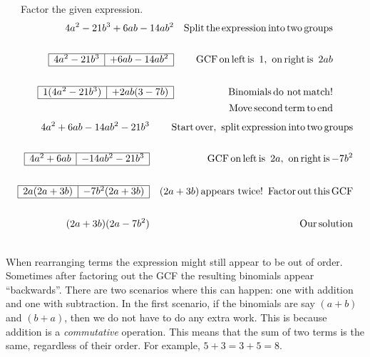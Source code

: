 \begin{example}~~~Factor the given expression.
  \begin{eqnarray*}
    4 a^2 - 21 b^3 + 6 a b - 14 a b^2 &  & \operatorname{Split} \operatorname{the}
    \operatorname{expression} \operatorname{into} \operatorname{two} \operatorname{groups}\\
    &&\\
	 \begin{array}{|l|l|}
      \hline
      4 a^2 - 21 b^3 & + 6 a b - 14 a b^2\\
      \hline
    \end{array} &  & \operatorname{GCF} \operatorname{on} \operatorname{left} \operatorname{is~} 1, \operatorname{~on}
    \operatorname{right} \operatorname{is~} 2 a b\\
   &&\\
	  \begin{array}{|l|l|}
      \hline
      1 (4 a^2 - 21 b^3) & + 2 a b (3 - 7 b)\\
      \hline
    \end{array} &  & \operatorname{Binomials} \operatorname{do~not} \operatorname{match} !\\
		&&\operatorname{~~~Move}
    \operatorname{second} \operatorname{term} \operatorname{to} \operatorname{end}\\
  \end{eqnarray*}
  \begin{eqnarray*}
    4 a^2 + 6 a b - 14 a b^2 - 21 b^3 &  & \operatorname{Start} \operatorname{over},
    \operatorname{~split} \operatorname{expression} \operatorname{into} \operatorname{two}
    \operatorname{groups}\\
   &&\\
	  \begin{array}{|l|l|}
      \hline
      4 a^2 + 6 ab & - 14 a b^2 - 21 b^3\\
      \hline
    \end{array} &  & \operatorname{GCF} \operatorname{on} \operatorname{left} \operatorname{is~} 2 a, \operatorname{~on}
    \operatorname{right} \operatorname{is} - 7 b^2\\
   &&\\
	  \begin{array}{|l|l|}
      \hline
      2 a (2 a + 3 b) & - 7 b^2 (2 a + 3 b)\\
      \hline
    \end{array} &  & (2 a + 3 b) \operatorname{appears~twice} !
    \operatorname{~Factor} \operatorname{out} \operatorname{this} \operatorname{GCF}\\
   &&\\
	  (2 a + 3 b) (2 a - 7 b^2) &  & \operatorname{Our} \operatorname{solution}
  \end{eqnarray*}
\end{example}
  ~\\
When rearranging terms the expression might still appear to be out of order. Sometimes after
factoring out the GCF the resulting binomials appear ``backwards''. There are two scenarios where this
can happen: one with addition and one with subtraction. In the first scenario, if the binomials are say $(a + b)$ and $(b + a)$, then we do not have to do any extra work.  This is because addition is a \textit{commutative} operation.  This means that the sum of two terms is the same, regardless of their order.  For example, $5 + 3 = 3 + 5 = 8$.

